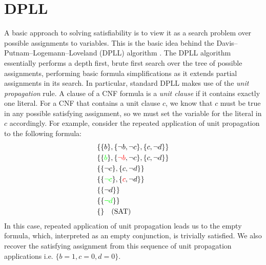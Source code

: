 \documentclass[12pt]{article}
\begin{document}
\section{DPLL}

A basic approach to solving satisfiability is to view it as a search problem over possible assignments to variables. This is the basic idea behind the Davis–Putnam–Logemann–Loveland (DPLL) algorithm \cite{dpll1961}. The DPLL algorithm essentially performs a depth first, brute first search over the tree of possible assignments, performing basic formula simplifications as it extends partial assignments in its search. In particular, standard DPLL makes use of the \textit{unit propagation} rule. A clause of a CNF formula is a \textit{unit clause} if it contains exactly one literal. For a CNF that contains a unit clause $c$, we know that $c$ must be true in any possible satisfying assignment, so we must set the variable for the literal in $c$ accordingly. For example, consider the repeated application of unit propagation to the following formula:
\begin{align*}
    &\{\{b\}, \{\neg b, \neg c\}, \{c, \neg d\}\}\\
    &\{\{\textcolor{green}{b}\}, \{\textcolor{red}{\neg b}, \neg c\}, \{c, \neg d\}\}\\
    &\{\{\neg c\}, \{c, \neg d\}\} \\
    &\{\{\textcolor{green}{\neg c}\}, \{\textcolor{red}{c}, \neg d\}\}\\
    &\{\{\neg d\}\}\\
    &\{\{\textcolor{green}{\neg d}\}\}\\
    &\{\} \quad (\text{SAT})
\end{align*}
In this case, repeated application of unit propagation leads us to the empty formula, which, interpreted as an empty conjunction, is trivially satisfied. We also recover the satisfying assignment from this sequence of unit propagation applications i.e. $\{b=1,c=0,d=0\}$.
\end{document}
